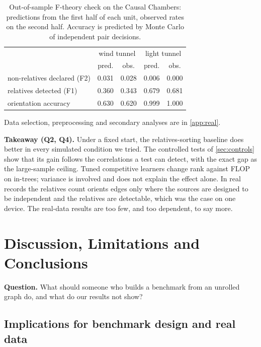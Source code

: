 \documentclass[pdflatex,sn-apa]{sn-jnl}
\theoremstyle{thmstyleone}
\theoremstyle{thmstylethree}
\theoremstyle{thmstyletwo}
\begin{document}
\begin{table}[t]
\caption{Out-of-sample F-theory check on the Causal Chambers: predictions
from the first half of each unit, observed rates on the second half.
Accuracy is predicted by Monte Carlo of independent pair decisions.}
\label{tab:ftheory}
\centering
\setlength{\tabcolsep}{4pt}
\begin{tabular}{lcccc}
\toprule
 & \multicolumn{2}{c}{wind tunnel} & \multicolumn{2}{c}{light tunnel} \\
 & pred. & obs. & pred. & obs. \\
\midrule
non-relatives declared (F2) & 0.031 & 0.028 & 0.006 & 0.000 \\
relatives detected (F1) & 0.360 & 0.343 & 0.679 & 0.681 \\
orientation accuracy & 0.630 & 0.620 & 0.999 & 1.000 \\
\bottomrule
\end{tabular}
\end{table}

Data selection, preprocessing and secondary analyses are in \cref{app:real}.

\textbf{Takeaway (Q2, Q4).} Under a fixed start, the relatives-sorting
baseline does better in every simulated condition we tried. The controlled
tests of \cref{sec:controls} show that its gain follows the correlations a test
can detect, with the exact gap as the large-sample ceiling. Tuned competitive
learners change rank against FLOP on in-trees; variance is involved and does
not explain the effect alone. In real records the relatives count orients edges
only where the sources are designed to be independent and the relatives are
detectable, which was the case on one device. The real-data results are too
few, and too dependent, to say more.

\section{Discussion, Limitations and Conclusions}
\label{sec:disc}

\textbf{Question.} What should someone who builds a benchmark from an unrolled
graph do, and what do our results not show?

\subsection{Implications for benchmark design and real data}
\end{document}
